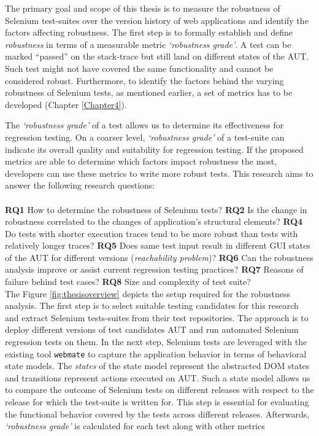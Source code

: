 
The primary goal and scope of this thesis is to measure the robustness of Selenium test-suites over the version history of web applications and identify the factors affecting robustness. The first step is to formally establish and define \textit{robustness} in terms of a measurable metric \textit{`robustness grade'}. A test can be marked ``passed'' on the stack-trace but still land on different states of the AUT. Such test might not have covered the same functionality and cannot be considered robust. Furthermore, to identify the factors behind the varying robustness of Selenium tests, as mentioned earlier, a set of metrics has to be developed (Chapter \ref{Chapter4}). 

The \textit{`robustness grade'} of a test allows us to determine its effectiveness for regression testing. On a coarser level, \textit{`robustness grade'} of a test-suite can indicate its overall quality and suitability for regression testing. If the proposed metrics are able to determine which factors impact robustness the most, developers can use these metrics to write more robust tests. This research aims to answer the following research questions:\\
\\
{\bfseries RQ1} How to determine the robustness of Selenium tests?
{\bfseries RQ2} Is the change in robustness correlated to the changes of application’s structural elements?
{\bfseries RQ4} Do tests with shorter execution traces tend to be more robust than tests with relatively longer traces?
{\bfseries RQ5} Does same test input result in different GUI states of the AUT for different versions (\textit{reachability problem})?
{\bfseries RQ6} Can the robustness analysis improve or assist current regression testing practices?
{\bfseries RQ7} Reasons of failure behind test cases?
{\bfseries RQ8} Size and complexity of test suite?
\\

The Figure \ref{fig:thesisoverview} depicts the setup required for the robustness analysis. The first step is to select suitable testing candidates for this research and extract Selenium tests-suites from their test repositories. The approach is to deploy different versions of test candidates AUT and run automated Selenium regression tests on them. In the next step, Selenium tests are leveraged with the existing tool \texttt{webmate}\cite{webmate} to capture the application behavior in terms of behavioral state models. The \textit{states} of the state model represent the abstracted DOM states and transitions represent actions executed on AUT. Such a state model allows us to compare the outcome of Selenium tests on different releases with respect to the release for which the test-suite is written for. This step is essential for evaluating the functional behavior covered by the tests across different releases. Afterwards, \textit{`robustness grade'} is calculated for each test along with other metrics

